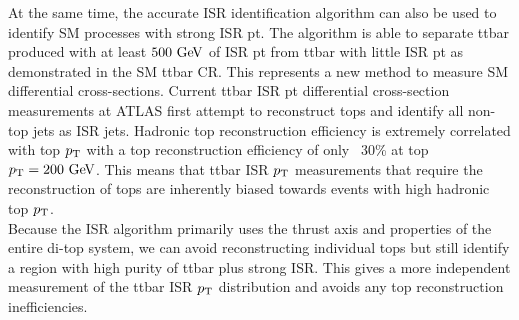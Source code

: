 \indent At the same time, the accurate ISR identification algorithm can also be used to identify SM processes with strong ISR pt.  The algorithm is able to separate ttbar produced with at least $500 \gev$ of ISR pt from ttbar with little ISR pt as demonstrated in the SM ttbar CR.  This represents a new method to measure SM differential cross-sections.  Current ttbar ISR pt differential cross-section measurements at ATLAS first attempt to reconstruct tops and identify all non-top jets as ISR jets.  Hadronic top reconstruction efficiency is extremely correlated with top $p_{\mathrm{T}}$ with a top reconstruction efficiency of only ~30\% at top $\pt = 200 \gev$.  This means that ttbar ISR $p_{\mathrm{T}}$ measurements that require the reconstruction of tops are inherently biased towards events with high hadronic top $p_{\mathrm{T}}$. \\

\indent Because the ISR algorithm primarily uses the thrust axis and properties of the entire di-top system, we can avoid reconstructing individual tops but still identify a region with high purity of ttbar plus strong ISR.  This gives a more independent measurement of the ttbar ISR $p_{\mathrm{T}}$ distribution and avoids any top reconstruction inefficiencies. \\
